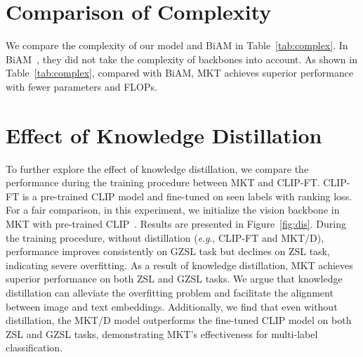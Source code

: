 \documentclass[letterpaper]{article} %
\newcommand{\eg}{\textit{e}.\textit{g}.}
\begin{document}









\section{Comparison of Complexity}
\label{section:Comparison of Complexity}
We compare the complexity of our model and BiAM in Table~\ref{tab:complex}.
In BiAM~\cite{biam}, they did not take the complexity of backbones into account.
As shown in Table~\ref{tab:complex}, compared with BiAM, MKT achieves superior performance with fewer parameters and FLOPs.




\section{Effect of Knowledge Distillation}
To further explore the effect of knowledge distillation, we compare the performance during the training procedure between MKT and CLIP-FT.
CLIP-FT is a pre-trained CLIP model and fine-tuned on seen labels with ranking loss.
For a fair comparison, in this experiment, we initialize the vision backbone in MKT with pre-trained CLIP~\cite{clip}. 
Results are presented in Figure~\ref{fig:dis}. 
During the training procedure, without distillation (\eg, CLIP-FT and MKT/D), performance improves consistently on GZSL task but declines on ZSL task, indicating severe overfitting.
As a result of knowledge distillation, MKT achieves superior performance on both ZSL and GZSL tasks.
We argue that knowledge distillation can alleviate the overfitting problem and facilitate the alignment between image and text embeddings.
Additionally, we find that even without distillation, the MKT/D model outperforms the fine-tuned CLIP model on both ZSL and GZSL tasks, demonstrating MKT's effectiveness for multi-label classification.

\end{document}

